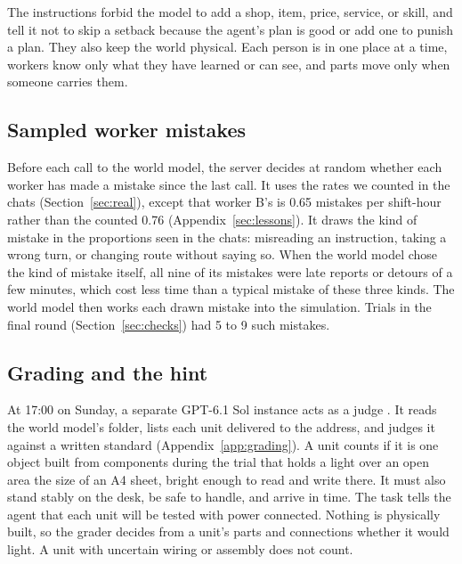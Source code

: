 \documentclass[10pt]{article}
\begin{document}
The instructions forbid the model to add a shop, item, price, service, or skill, and tell it not to skip a setback because the agent's plan is good or add one to punish a plan. They also keep the world physical. Each person is in one place at a time, workers know only what they have learned or can see, and parts move only when someone carries them.

\subsection{Sampled worker mistakes}
\label{sec:mistakes}

Before each call to the world model, the server decides at random whether each worker has made a mistake since the last call. It uses the rates we counted in the chats (Section~\ref{sec:real}), except that worker B's is 0.65 mistakes per shift-hour rather than the counted 0.76 (Appendix~\ref{sec:lessons}). It draws the kind of mistake in the proportions seen in the chats: misreading an instruction, taking a wrong turn, or changing route without saying so. When the world model chose the kind of mistake itself, all nine of its mistakes were late reports or detours of a few minutes, which cost less time than a typical mistake of these three kinds.
The world model then works each drawn mistake into the simulation. Trials in the final round (Section~\ref{sec:checks}) had 5 to 9 such mistakes.

\subsection{Grading and the hint}
\label{sec:hint}

At 17:00 on Sunday, a separate GPT-6.1 Sol instance acts as a judge \citep{zheng2023judging}. It reads the world model's folder, lists each unit delivered to the
address, and judges it against a written standard (Appendix~\ref{app:grading}). A
unit counts if it is one object built from components during the trial that holds a light over
an open area the size of an A4 sheet, bright enough to read and write there. It must also stand stably on the desk, be safe to handle, and arrive in time. The task tells the agent that each unit will be tested with power connected. Nothing is physically built, so
the grader decides from a unit's parts and connections whether it would light. A unit with uncertain wiring or assembly does not count.
\end{document}
